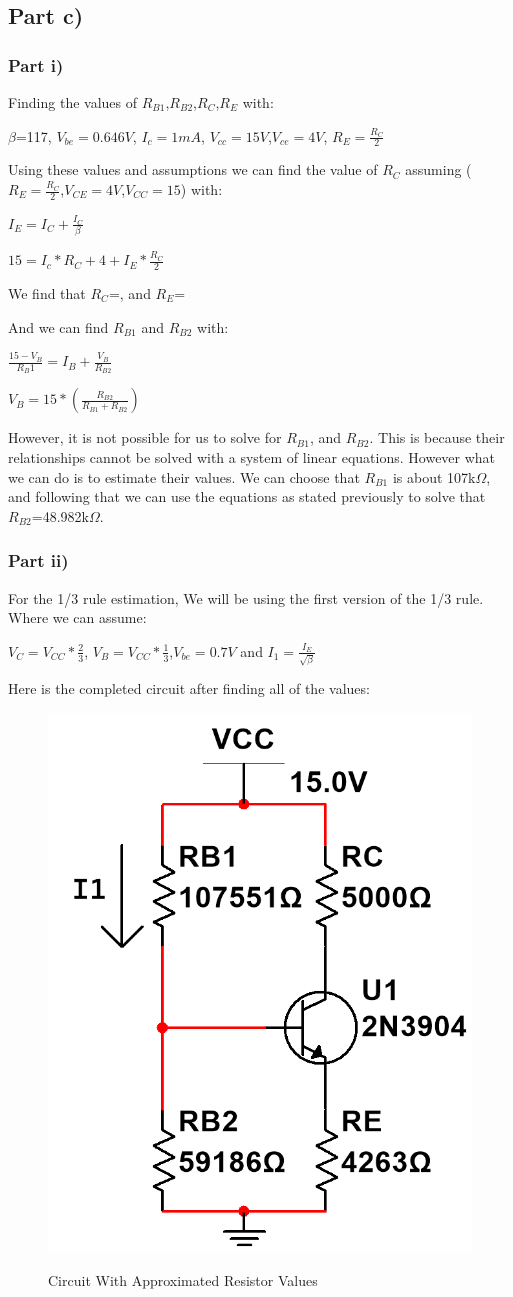 \documentclass[12pt]{article}
\begin{document}
\subsection{Part c)}
\subsubsection{Part i)}
Finding the values of $R_{B1}$,$R_{B2}$,$R_C$,$R_E$ with:
\begin{center}
    $\beta$=117, $V_{be}=0.646V$, $I_c=1mA$, $V_{cc}=15V$,$V_{ce}=4V$, $R_E=\frac{R_C}{2}$
\end{center}

Using these values and assumptions we can find the value of $R_{C}$ assuming ($R_E=\frac{R_C}{2}$,$V_{CE}=4V$,$V_{CC}=15$) with: 
\begin{center}
$I_E=I_C+\frac{I_C}{\beta}$
\end{center}
\begin{center}
$15=I_c*R_C+4+I_E*\frac{R_C}{2}$ 
\end{center}
\begin{center}
We find that $R_C$=, and $R_E$=
\end{center}
And we can find $R_{B1}$ and $R_{B2}$ with:
\begin{center}
$\frac{15-V_B}{R_B1}=I_B+\frac{V_B}{R_{B2}}$
\end{center}
\begin{center}
$V_B=15*(\frac{R_{B2}}{R_{B1}+R_{B2}})$    
\end{center}
However, it is not possible for us to solve for $R_{B1}$, and $R_{B2}$. This is because their relationships cannot be solved with a system of linear equations. However what we can do is to estimate their values. We can choose that $R_{B1}$ is about 107k$\Omega$, and following that we can use the equations as stated previously to solve that $R_{B2}$=48.982k$\Omega$.
\subsubsection{Part ii)}
For the 1/3 rule estimation, We will be using the first version of the 1/3 rule. Where we can assume:
\begin{center}
    $V_C=V_{CC}*\frac{2}{3}$, $V_B=V_{CC}*\frac{1}{3}$,$V_{be}=0.7V$ and $I_1=\frac{I_E}{\sqrt{\beta}}$ 
\end{center}
Here is the completed circuit after finding all of the values:
\begin{figure}[H]
\centering
\includegraphics[height=0.25\textwidth]{Images/part1c_circuit.png}\\
\caption{Circuit With Approximated Resistor Values}
\label{fig:part1c}
\end{figure}
\end{document}
